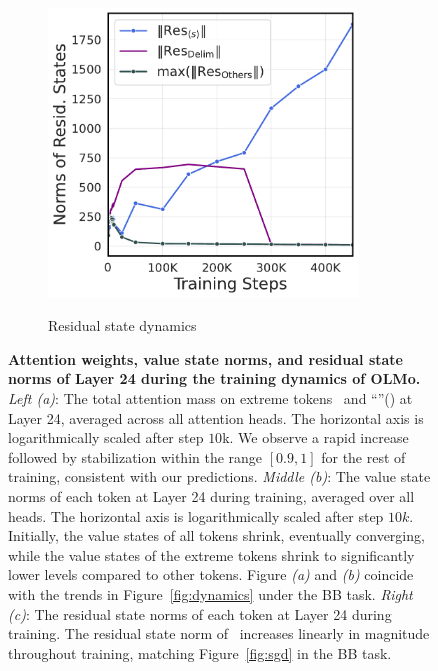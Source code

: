 \begin{figure}[t]
\begin{subfigure}[t]{0.32\textwidth}
        \label{fig:olmo_drain}
    \end{subfigure}
    \begin{subfigure}[t]{0.32\textwidth}
        \centering 
        \caption{\small Residual state dynamics}
        \includegraphics[width=0.9\textwidth]{Figures/olmo/layer_output_norms.pdf}
        \label{fig:olmo_peak}
    \end{subfigure}
    \caption{\small \textbf{Attention weights, value state norms, and residual state norms of Layer 24 during the training dynamics of OLMo.} \textit{Left (a)}: The total attention mass on extreme tokens \bos~and ``''(\period) at Layer 24, averaged across all attention heads. The horizontal axis is logarithmically scaled after step $10$k. We observe a rapid increase followed by stabilization within the range \([0.9, 1]\) for the rest of training, consistent with our predictions. \textit{Middle (b)}: The value state norms of each token at Layer 24 during training, averaged over all heads. The horizontal axis is logarithmically scaled after step $10k$. Initially, the value states of all tokens shrink, eventually converging, while the value states of the extreme tokens shrink to significantly lower levels compared to other tokens. Figure \textit{(a)} and \textit{(b)} coincide with the trends in Figure~\ref{fig:dynamics} under the BB task. \textit{Right (c)}: The residual state norms of each token at Layer 24 during training. The residual state norm of \bos~increases linearly in magnitude throughout training, matching Figure~\ref{fig:sgd} in the BB task.}



    
    \label{fig:olmo_predictions_phase0}
\end{figure}
